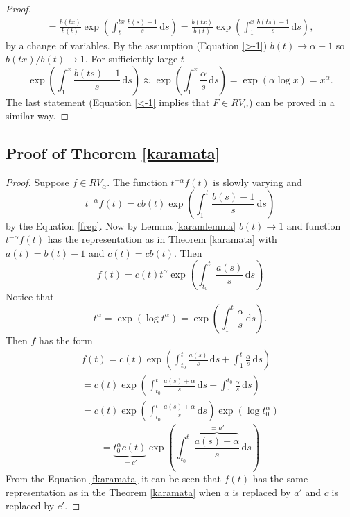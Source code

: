 \documentclass[english,12pt,a4paper,pdftex,sci,utf8]{aaltothesis} %
\begin{document}
\begin{proof}
\begin{equation*}
\begin{split}
= \frac{b(tx)}{b(t)} \exp \left( \int_{t}^{tx} \frac{b(s)-1}{s}\,\mathrm{d}s\right)
= \frac{b(tx)}{b(t)} \exp \left( \int_{1}^{x} \frac{b(ts)-1}{s}\,\mathrm{d}s\right),
\end{split}
\end{equation*}
by a change of variables. By the assumption (Equation \eqref{>-1}) $b(t) \rightarrow \alpha + 1$ so $b(tx)/b(t) \rightarrow 1$. For sufficiently large $t$
\begin{equation*}
\exp \left( \int_{1}^{x} \frac{b(ts)-1}{s}\,\mathrm{d}s\right) \approx \exp \left( \int_{1}^{x} \frac{\alpha}{s}\,\mathrm{d}s\right)=\exp \left(\alpha \log x \right) = x^{\alpha}.
\end{equation*}
The last statement (Equation \eqref{<-1} implies that $F \in RV_{\alpha}$) can be proved in a similar way.
\end{proof}

\subsection{Proof of Theorem \ref{karamata}}

\begin{proof}
Suppose $f \in RV_{\alpha}$. The function $t^{-\alpha}f(t)$ is slowly varying and
\begin{equation*}
t^{-\alpha}f(t) = cb(t) \exp \left( \int_{1}^{t} \frac{b(s)-1}{s}\,\mathrm{d}s \right)
\end{equation*}
by the Equation \eqref{frep}. Now by Lemma \ref{karamlemma} $b(t) \rightarrow 1$ and function $t^{-\alpha}f(t)$ has the representation as in Theorem \ref{karamata} with $a(t)=b(t)-1$ and $c(t)=cb(t)$. Then
\begin{equation*}
f(t) = c(t)t^{\alpha} \exp \left(  \int_{t_0}^{t} \frac{a(s)}{s}\,\mathrm{d}s  \right)
\end{equation*}
Notice that $$t^{\alpha}=\exp \left( \log t^{\alpha} \right)=\exp \left(  \int_{1}^{t} \frac{\alpha}{s}\,\mathrm{d}s  \right).$$ Then $f$ has the form
\begin{equation*}
\begin{split}
f(t) = c(t) \exp \left(  \int_{t_0}^{t} \frac{a(s)}{s}\,\mathrm{d}s + \int_{1}^{t} \frac{\alpha}{s}\,\mathrm{d}s  \right) \\
= c(t) \exp \left(  \int_{t_0}^{t} \frac{a(s)+\alpha}{s}\,\mathrm{d}s + \int_{1}^{t_0} \frac{\alpha}{s}\,\mathrm{d}s  \right)\\
= c(t) \exp \left(  \int_{t_0}^{t} \frac{a(s)+\alpha}{s}\,\mathrm{d}s \right) \exp \left( \log t_0^{\alpha}  \right)
\end{split}
\end{equation*}
\begin{equation}
= \underbrace{t_0^{\alpha}c(t)}_{=c'} \exp \left(  \int_{t_0}^{t} \frac{\overbrace{a(s)+\alpha}^{=a'}}{s}\,\mathrm{d}s \right)
\label{fkaramata}
\end{equation}
From the Equation \eqref{fkaramata} it can be seen that $f(t)$ has the same representation as in the Theorem \ref{karamata} when $a$ is replaced by $a'$ and $c$ is replaced by $c'$.
\end{proof}
\end{document}
